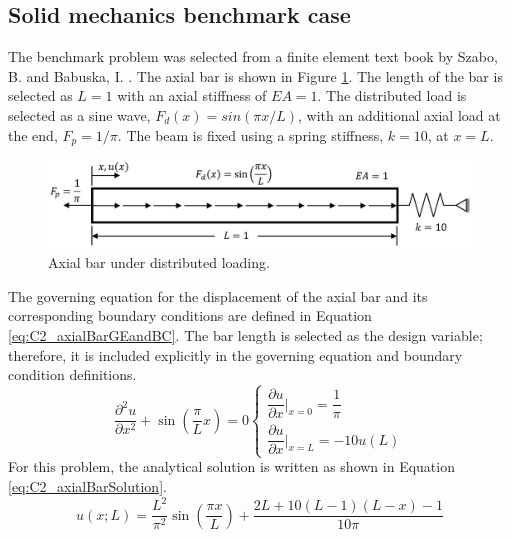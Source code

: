 \subsection{Solid mechanics benchmark case}\label{section:C2_solid_mechanics_benchmark}
The benchmark problem was selected from a finite element text book by Szabo, B. and Babuska, I. \cite{szabo1991finite}. The axial bar is shown in Figure \ref{fig:C2_axialBarPhysicalShape}. The length of the bar is selected as $L = 1$ with an axial stiffness of $EA = 1$. The distributed load is selected as a sine wave, $F_d(x) = sin(\pi x/L)$, with an additional axial load at the end, $F_p = 1 / \pi$. The beam is fixed using a spring stiffness, $k = 10$, at $x = L$.
%
\begin{figure}[h]
    \centering
    \includegraphics[width=14.00cm]{Chapter_2/figure/solid_mechanics_benchmark.png}
    \caption{Axial bar under distributed loading.}
    \label{fig:C2_axialBarPhysicalShape}
\end{figure}
%
The governing equation for the displacement of the axial bar and its corresponding boundary conditions are defined in Equation \eqref{eq:C2_axialBarGEandBC}. The bar length is selected as the design variable; therefore, it is included explicitly in the governing equation and boundary condition definitions.
%
\begin{subequations}\label{eq:C2_axialBarGEandBC}
\begin{equation}\label{eq:C2_axialBarGE}
    \frac{\partial^2 u}{\partial x^2} + \sin \left( \frac{\pi}{L} x \right) = 0
\end{equation}
\begin{equation}\label{eq:C2_axialBarBC}
    \begin{cases}
    \dfrac{\partial u}{\partial x} \bigg|_{x = 0} = \dfrac{1}{\pi} \\
    \dfrac{\partial u}{\partial x} \bigg|_{x = L} = -10 u(L)
    \end{cases}
\end{equation}
\end{subequations}
%
For this problem, the analytical solution is written as shown in Equation \eqref{eq:C2_axialBarSolution}.
%
\begin{equation}\label{eq:C2_axialBarSolution}
    u(x; L) = 
    \frac{L^2}{\pi^2} \sin \left( \frac{\pi x}{L} \right) + 
    \frac{2L + 10(L - 1)(L - x) - 1}{10 \pi}
\end{equation}
